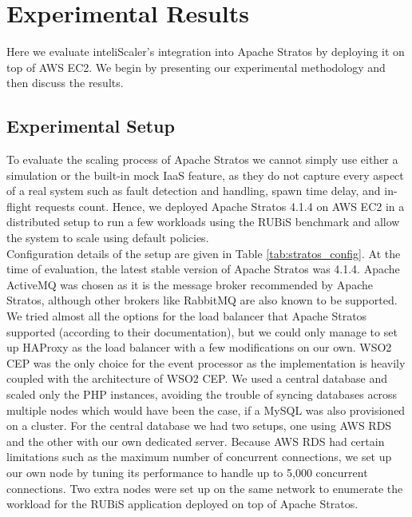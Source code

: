 \section{Experimental Results}
Here we evaluate inteliScaler's integration into Apache Stratos by deploying it on top of AWS EC2. We begin by presenting our experimental methodology and then discuss the results.

\subsection{Experimental Setup}
To evaluate the scaling process of Apache Stratos we cannot simply use either a simulation or the built-in mock IaaS feature, as they do not capture every aspect of a real system such as fault detection and handling, spawn time delay, and in-flight requests count. Hence, we deployed Apache Stratos 4.1.4 on AWS EC2 in a distributed setup to run a few workloads using the RUBiS benchmark and allow the system to scale using default policies.\\

Configuration details of the setup are given in Table \ref{tab:stratos_config}. At the time of evaluation, the latest stable version of Apache Stratos was 4.1.4. Apache ActiveMQ was chosen as it is the message broker recommended by Apache Stratos, although other brokers like RabbitMQ are also known to be supported. We tried almost all the options for the load balancer that Apache Stratos supported (according to their documentation), but we could only manage to set up HAProxy as the load balancer with a few modifications on our own. WSO2 CEP was the only choice for the event processor as the implementation is heavily coupled with the architecture of WSO2 CEP. We used a central database and scaled only the PHP instances, avoiding the trouble of syncing databases across multiple nodes which would have been the case, if a MySQL was also provisioned on a cluster. For the central database we had two setups, one using AWS RDS and the other with our own dedicated server. Because AWS RDS had certain limitations such as the maximum number of concurrent connections, we set up our own node by tuning its performance to handle up to 5,000 concurrent connections. Two extra nodes were set up on the same network to enumerate the workload for the RUBiS application deployed on top of Apache Stratos.


